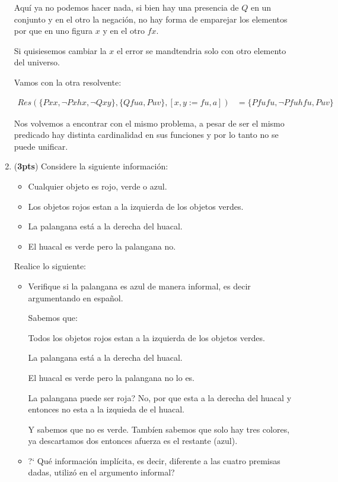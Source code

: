 \documentclass[11pt,letterpaper]{article}
\begin{document}
\begin{enumerate}
Aquí ya no podemos hacer nada, si bien hay una presencia de $Q$ en un
conjunto y en el otro la negación, no hay forma de
emparejar los elementos por que en uno figura $x$ y en el otro $fx$.

Si quisiesemos cambiar la $x$ el error se mandtendria solo
con otro elemento del universo.

Vamos con la otra resolvente:

\begin{align*}
  Res(\{Pxx, \neg Pxhx,\neg Qxy\}, \{Qfua, Puv\}, [x, y:= fu, a]) &= \{Pfufu, \neg Pfuhfu, Puv\}
\end{align*}

Nos volvemos a encontrar con el mismo problema, a pesar de ser el mismo
predicado hay distinta cardinalidad en sus funciones y por lo tanto no se puede
unificar.

\newpage
\item ({\bf 3pts}) Considere la siguiente información:
  \begin{itemize}
  \item Cualquier objeto es rojo, verde o azul.
  \item Los objetos rojos estan a la izquierda de los objetos verdes.
  \item La palangana está a la derecha del huacal.
  \item El huacal es verde pero la palangana no.
  \end{itemize}
Realice lo siguiente:
\begin{itemize}

\item Verifique si la palangana es azul de manera informal, es decir
  argumentando en español.

  \hfill\break
  Sabemos que:

  Todos los objetos rojos estan a la izquierda de los objetos verdes.

  La palangana está a la derecha del huacal.

  El huacal es verde pero la palangana no lo es.

  La palangana puede ser roja? No, por que esta a la derecha del huacal
  y entonces no esta a la izquieda
  de el huacal.

  Y sabemos que no es verde. Tambíen sabemos que solo
  hay tres colores, ya descartamos dos entonces afuerza es el restante
  (azul).

\item ?` Qué información implícita, es decir, diferente a las cuatro premisas
  dadas, utilizó en el argumento informal?


\end{itemize}
\end{enumerate}
\end{document}
